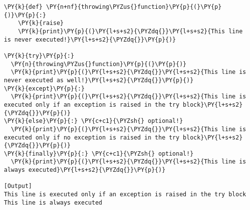 \begin{Verbatim}[label=\makebox{\url{https://github.com/lucabaldini/cmepda/tree/master/slides/latex/snippets/exceptions.py}},commandchars=\\\{\}]
\PY{k}{def} \PY{n+nf}{throwing\PYZus{}function}\PY{p}{(}\PY{p}{)}\PY{p}{:}
    \PY{k}{raise}
    \PY{k}{print}\PY{p}{(}\PY{l+s+s2}{\PYZdq{}}\PY{l+s+s2}{This line is never executed!}\PY{l+s+s2}{\PYZdq{}}\PY{p}{)}

\PY{k}{try}\PY{p}{:}
  \PY{n}{throwing\PYZus{}function}\PY{p}{(}\PY{p}{)}
  \PY{k}{print}\PY{p}{(}\PY{l+s+s2}{\PYZdq{}}\PY{l+s+s2}{This line is never executed as well!}\PY{l+s+s2}{\PYZdq{}}\PY{p}{)}
\PY{k}{except}\PY{p}{:}
  \PY{k}{print}\PY{p}{(}\PY{l+s+s2}{\PYZdq{}}\PY{l+s+s2}{This line is executed only if an exception is raised in the try block}\PY{l+s+s2}{\PYZdq{}}\PY{p}{)}
\PY{k}{else}\PY{p}{:} \PY{c+c1}{\PYZsh{} optional!}
  \PY{k}{print}\PY{p}{(}\PY{l+s+s2}{\PYZdq{}}\PY{l+s+s2}{This line is executed only if no exception is raised in the try block}\PY{l+s+s2}{\PYZdq{}}\PY{p}{)}
\PY{k}{finally}\PY{p}{:} \PY{c+c1}{\PYZsh{} optional!}
  \PY{k}{print}\PY{p}{(}\PY{l+s+s2}{\PYZdq{}}\PY{l+s+s2}{This line is always executed}\PY{l+s+s2}{\PYZdq{}}\PY{p}{)}

[Output]
This line is executed only if an exception is raised in the try block
This line is always executed
\end{Verbatim}